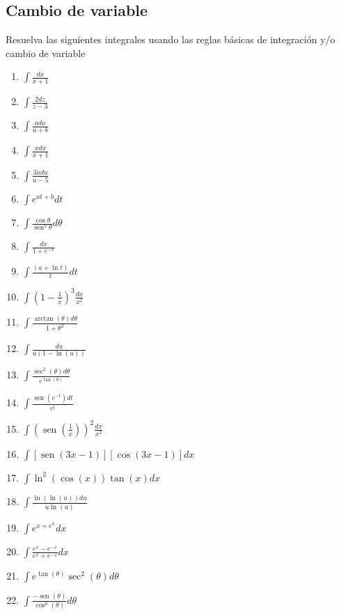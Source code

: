 \documentclass{article}
\begin{document}
\begin{multicols}{2}
\section*{Cambio de variable}
Resuelva las siguientes integrales usando las reglas básicas de integración y/o cambio de variable
\begin{enumerate}    
    \item $\displaystyle \int \frac{dx}{x + 1}$
    \item $\displaystyle \int \frac{2dz}{z - 3}$
    \item $\displaystyle \int \frac{a du}{u + b}$
    \item $\displaystyle \int \frac{x dx}{x + 1}$
    \item $\displaystyle \int \frac{3u du}{u - 5}$
    \item $\displaystyle \int e^{at+b} dt$    
     \item $\displaystyle \int \frac{\cos \theta}{\operatorname{sen}^7 \theta} d\theta$
    \item $\displaystyle \int \frac{dx}{1 + e^{-x}}$
    \item $\displaystyle \int \frac{(a + \ln t)}{t} dt$
    \item $\displaystyle \int \left(1 - \frac{1}{x}\right)^3 \frac{dx}{x^2}$
    \item $\displaystyle \int \frac{\operatorname{arctan} (\theta) d\theta}{1 + \theta^2}$
    \item $\displaystyle \int \frac{du}{u(1 - \ln (u))}$
    \item $\displaystyle \int \frac{\sec^2 (\theta) d\theta}{e^{\operatorname{tan} (\theta)}}$
    \item $\displaystyle \int \frac{\operatorname{sen}(e^{-t}) dt}{e^t}$
    \item $\displaystyle \int \left(\operatorname{sen}\left(\frac{1}{x}\right)\right)^2 \frac{dx}{x^2}$
    \item $\displaystyle \int [\operatorname{sen}(3x - 1)][\cos(3x - 1)] dx$
    \item $\displaystyle \int \ln^2 (\cos (x)) \operatorname{tan} (x) dx$
    \item $\displaystyle \int \frac{\ln(\ln ( u)) du}{u \ln (u)}$
    \item $\displaystyle \int e^{x + e^x} dx$
    \item $\displaystyle \int \frac{e^x - e^{-x}}{e^x + e^{-x}} dx$
    \item $\displaystyle \int e^{\operatorname{tan} (\theta)} \sec^2 (\theta) d\theta$
    \item $\displaystyle \int \frac{-\operatorname{sen} (\theta)}{\cos^6 (\theta)} d\theta$

\end{enumerate}
\end{multicols}
\end{document}
